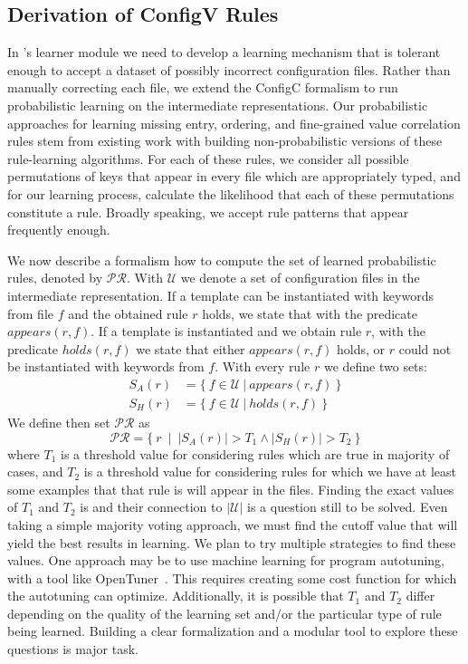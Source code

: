 \subsection{Derivation of ConfigV Rules}
\label{subsec-rules}

In \app's learner module we need to develop a learning mechanism
that is tolerant 
enough to accept a dataset of possibly incorrect configuration files.
Rather than manually correcting each file, 
we extend the ConfigC formalism to run probabilistic learning
on the intermediate representations.
Our probabilistic approaches for learning missing entry, 
ordering, and fine-grained value correlation rules stem 
from existing work with building 
non-probabilistic versions of these rule-learning algorithms. 
For each of these rules, 
we consider all possible permutations of keys that appear in every 
file which are appropriately typed, and for our learning process, calculate the likelihood that each of 
these permutations constitute a rule. 
Broadly speaking, we accept rule patterns that appear frequently enough.

We now describe a formalism how to compute the set of learned
probabilistic rules, denoted by $\mathcal{PR}$.
With $\mathcal{U}$ we denote a set of configuration files in the 
intermediate representation. If a template can be instantiated with
keywords from file $f$ and the obtained rule $r$ holds, we state that with the predicate 
$\mathit{appears}(r,f)$.
If a template is instantiated and we obtain rule $r$, with  the predicate 
$\mathit{holds}(r,f)$ we state that either $\mathit{appears}(r,f)$ holds, or $r$ could not be instantiated with keywords from $f$. With every 
rule $r$ we define two sets:
\begin{align*}
S_A(r)& =\{ \ f \in \mathcal{U}\ | \ \mathit{appears}(r,f)\  \} \\
S_H(r)& =\{ \ f \in \mathcal{U}\  | \ \mathit{holds}(r,f) \ \}
\end{align*}
We define then set $\mathcal{PR}$ as
$$\mathcal{PR} = \{\ r \ \mid \ |S_A(r)| > T_1 \land |S_H(r)| > T_2 \ \} $$
where $T_1$ is a threshold value for considering rules which are true in 
majority of cases, and $T_2$ is a threshold value for considering rules 
for which we have at least some examples that that rule is will 
appear in the files. Finding the exact values of $T_1$ and $T_2$ is 
and their connection to $|\mathcal{U}|$
is a question still to be solved.
Even taking a simple majority voting approach, we must find the cutoff value that will yield the best results in learning.
We plan to try multiple strategies to find these values.
One approach may be to use machine learning for program autotuning, with a tool like OpenTuner~\cite{ansel:pact:2014}.
This requires creating some cost function for which the autotuning can optimize.
Additionally, it is possible that $T_1$ and $T_2$ differ depending on the quality of the learning set and/or the particular type of rule being learned.
Building a clear formalization and a modular tool to explore these questions is major task.

